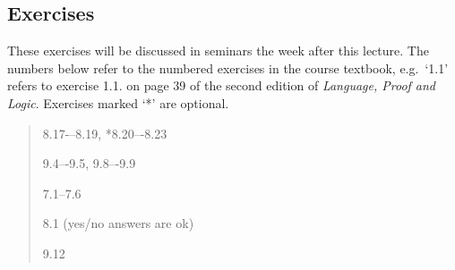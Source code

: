 \documentclass[12pt]{extarticle}
\begin{document}
\begin{multicols*}{3}
 
 
\vfill
\begin{minipage}{\columnwidth}
\section{Exercises}
These exercises will be discussed in seminars the week after this lecture.
The numbers below refer to the numbered exercises in the course textbook, e.g.\ `1.1' refers to exercise 1.1. on page 39 of the second edition of \emph{Language, Proof and Logic}. Exercises marked `*' are optional.
 
\begin{quote}
8.17-–8.19, *8.20–-8.23
 
9.4–-9.5, 9.8–-9.9
 
7.1--7.6
 
8.1 (yes/no answers are ok)
 
9.12
 
\end{quote}
\end{minipage}




 


\end{multicols*}
\end{document}
